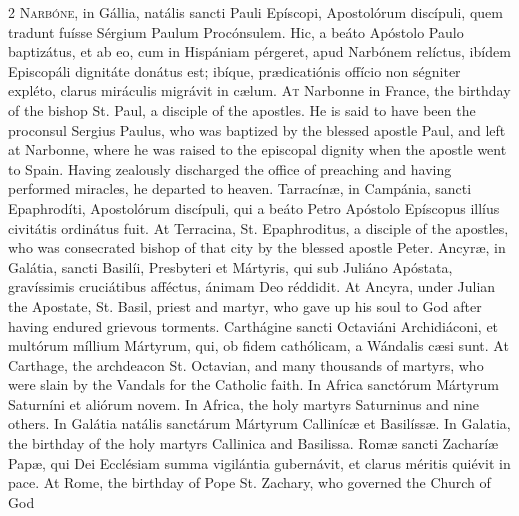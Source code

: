 \begin{paracol}{2}
\lettrine[lines=2]{N}{arbóne,} in Gállia, natális sancti Pauli Epíscopi, Apostolórum discípuli, 
 quem tradunt fuísse Sérgium Paulum Procónsulem. Hic, a beáto Apóstolo 
 Paulo baptizátus, et ab eo, cum in Hispániam pérgeret, apud Narbónem 
 relíctus, ibídem Episcopáli dignitáte donátus est; ibíque, prædicatiónis 
 offício non ségniter expléto, clarus miráculis migrávit in cælum.
\switchcolumn
{}
\lettrine[lines=2]{A}{t} Narbonne in France, the birthday of the bishop St. Paul, a disciple of 
 the apostles. He is said to have been the proconsul Sergius Paulus, 
 who was baptized by the blessed apostle Paul, and left at Narbonne, where he 
 was raised to the episcopal dignity when the apostle went to Spain. 
 Having zealously discharged the office of preaching and having performed 
 miracles, he departed to heaven.
\switchcolumn*
{}
Tarracínæ, in Campánia, sancti Epaphrodíti, 
 Apostolórum discípuli, qui a beáto Petro Apóstolo Epíscopus illíus civitátis 
 ordinátus fuit.
\switchcolumn
{}
At Terracina, St. Epaphroditus, a disciple of the apostles, who was 
 consecrated bishop of that city by the blessed apostle Peter.
\switchcolumn*
{}
Ancyræ, in Galátia, sancti Basilíi, Presbyteri 
 et Mártyris, qui sub Juliáno Apóstata, gravíssimis cruciátibus afféctus, 
 ánimam Deo réddidit.
\switchcolumn
{}
At Ancyra, under Julian the Apostate, St. Basil, priest and martyr, who gave 
 up his soul to God after having endured grievous torments.
\switchcolumn*
{}
Carthágine sancti Octaviáni Archidiáconi, et multórum míllium Mártyrum, qui, 
 ob fidem cathólicam, a Wándalis cæsi sunt.
\switchcolumn
{}
At Carthage, the archdeacon St. Octavian, and many thousands of martyrs, who 
 were slain by the Vandals for the Catholic faith.
\switchcolumn*
{}
In Africa sanctórum Mártyrum Saturníni et aliórum novem.
\switchcolumn
{}
In Africa, the holy martyrs Saturninus and nine others.
\switchcolumn*
{}
In Galátia natális sanctárum Mártyrum Callinícæ 
 et Basilíssæ.
\switchcolumn
{}
In Galatia, the birthday of the holy martyrs Callinica and Basilissa.
\switchcolumn*
{}
Romæ sancti Zacharíæ Papæ, qui Dei Ecclésiam 
 summa vigilántia gubernávit, et clarus méritis quiévit in pace.
\switchcolumn
{}
At Rome, the birthday of Pope St. Zachary, who governed the Church of God 

\end{paracol}

